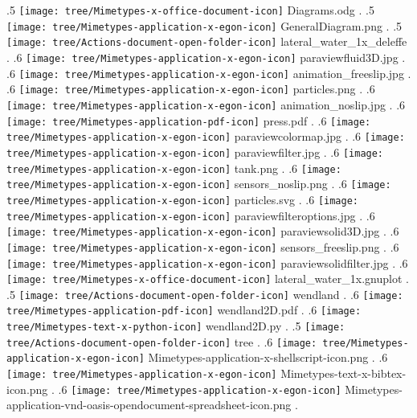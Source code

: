 {.5 { \texttt{[image: tree/Mimetypes-x-office-document-icon]} Diagrams.odg }.
.5 { \texttt{[image: tree/Mimetypes-application-x-egon-icon]} GeneralDiagram.png }.
.5 { \texttt{[image: tree/Actions-document-open-folder-icon]} lateral\_water\_1x\_deleffe }.
.6 { \texttt{[image: tree/Mimetypes-application-x-egon-icon]} paraviewfluid3D.jpg }.
.6 { \texttt{[image: tree/Mimetypes-application-x-egon-icon]} animation\_freeslip.jpg }.
.6 { \texttt{[image: tree/Mimetypes-application-x-egon-icon]} particles.png }.
.6 { \texttt{[image: tree/Mimetypes-application-x-egon-icon]} animation\_noslip.jpg }.
.6 { \texttt{[image: tree/Mimetypes-application-pdf-icon]} press.pdf }.
.6 { \texttt{[image: tree/Mimetypes-application-x-egon-icon]} paraviewcolormap.jpg }.
.6 { \texttt{[image: tree/Mimetypes-application-x-egon-icon]} paraviewfilter.jpg }.
.6 { \texttt{[image: tree/Mimetypes-application-x-egon-icon]} tank.png }.
.6 { \texttt{[image: tree/Mimetypes-application-x-egon-icon]} sensors\_noslip.png }.
.6 { \texttt{[image: tree/Mimetypes-application-x-egon-icon]} particles.svg }.
.6 { \texttt{[image: tree/Mimetypes-application-x-egon-icon]} paraviewfilteroptions.jpg }.
.6 { \texttt{[image: tree/Mimetypes-application-x-egon-icon]} paraviewsolid3D.jpg }.
.6 { \texttt{[image: tree/Mimetypes-application-x-egon-icon]} sensors\_freeslip.png }.
.6 { \texttt{[image: tree/Mimetypes-application-x-egon-icon]} paraviewsolidfilter.jpg }.
.6 { \texttt{[image: tree/Mimetypes-x-office-document-icon]} lateral\_water\_1x.gnuplot }.
.5 { \texttt{[image: tree/Actions-document-open-folder-icon]} wendland }.
.6 { \texttt{[image: tree/Mimetypes-application-pdf-icon]} wendland2D.pdf }.
.6 { \texttt{[image: tree/Mimetypes-text-x-python-icon]} wendland2D.py }.
.5 { \texttt{[image: tree/Actions-document-open-folder-icon]} tree }.
.6 { \texttt{[image: tree/Mimetypes-application-x-egon-icon]} Mimetypes-application-x-shellscript-icon.png }.
.6 { \texttt{[image: tree/Mimetypes-application-x-egon-icon]} Mimetypes-text-x-bibtex-icon.png }.
.6 { \texttt{[image: tree/Mimetypes-application-x-egon-icon]} Mimetypes-application-vnd-oasis-opendocument-spreadsheet-icon.png }.
}
